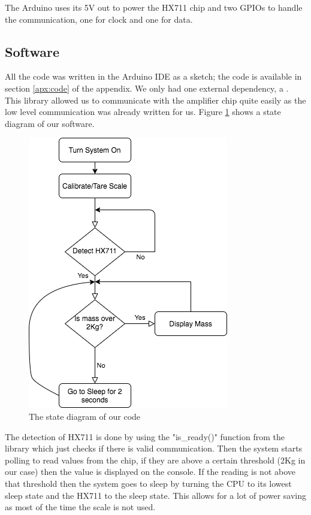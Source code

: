 \documentclass[letterpaper,11pt]{article}
\newcommand{\myLink}[2]{\href{#1}{\color{blue}\underline{\smash{\texttt{#2}}}}}
\begin{document}
The Arduino uses its 5V out to power the HX711 chip and two GPIOs to handle the
communication, one for clock and one for data.

\subsection{Software}
All the code was written in the Arduino IDE as a sketch; the code is available
in section \ref{apx:code} of the appendix. We only had one external dependency,
a \myLink{https://github.com/bogde/HX711}{HX711 library}. This library allowed
us to communicate with the amplifier chip quite easily as the low level
communication was already written for us. Figure \ref{img:stateflow} shows a
state diagram of our software.

\begin{figure}[h]
  \centering
  \includegraphics[scale=.7]{Flow}
  \caption{The state diagram of our code}
  \label{img:stateflow}
\end{figure}

The detection of HX711 is done by using the "is\_ready()" function from the
library which just checks if there is valid communication. Then the system
starts polling to read values from the chip, if they are above a certain
threshold (2Kg in our case) then the value is displayed on the console. If the
reading is not above that threshold then the system goes to sleep by turning the
CPU to its lowest sleep state and the HX711 to the sleep state. This allows for
a lot of power saving as most of the time the scale is not used.
\end{document}

